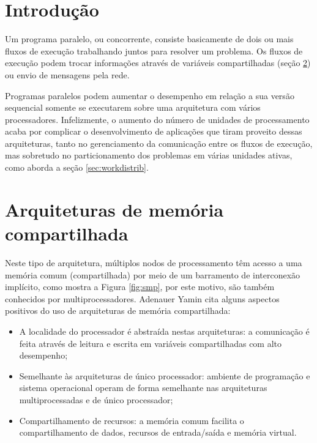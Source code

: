 \documentclass[ccc, pg2]{esinucpel}
\begin{document}
\section{Introdução}
Um programa paralelo, ou concorrente, consiste basicamente de dois ou mais fluxos de execução trabalhando juntos para resolver um problema. Os fluxos de execução podem trocar informações através de variáveis compartilhadas (seção \ref{sec:sharedmem}) ou envio de mensagens pela rede.

Programas paralelos podem aumentar o desempenho em relação a sua versão sequencial somente se executarem sobre uma arquitetura com vários processadores. Infelizmente, o aumento do número de unidades de processamento acaba por complicar o desenvolvimento de aplicações que tiram proveito dessas arquiteturas, tanto no gerenciamento da comunicação entre os fluxos de execução, mas sobretudo no particionamento dos problemas em várias unidades ativas, como aborda a seção \ref{sec:workdistrib}. %

\section{Arquiteturas de memória compartilhada} \label{sec:sharedmem}
Neste tipo de arquitetura, múltiplos nodos de processamento têm acesso a uma memória comum (compartilhada) por meio de um barramento de interconexão implícito, como mostra a Figura \ref{fig:smp}, por este motivo, são também conhecidos por multiprocessadores. Adenauer Yamin \cite{bib:adenauer} cita alguns aspectos positivos do uso de arquiteturas de memória compartilhada:

\begin{itemize}
\item A localidade do processador é abstraída nestas arquiteturas: a comunicação é feita através de leitura e escrita em variáveis compartilhadas com alto desempenho;

\item Semelhante às arquiteturas de único processador: ambiente de programação e sistema operacional operam de forma semelhante nas arquiteturas multiprocessadas e de único processador;

\item Compartilhamento de recursos: a memória comum facilita o compartilhamento de dados, recursos de entrada/saída e memória virtual.
\end{itemize}
\end{document}
